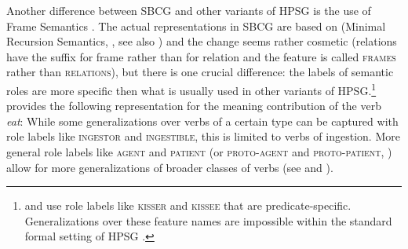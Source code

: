 \documentclass[output=paper
	        ,collection
	        ,collectionchapter
 	        ,biblatex
                ,babelshorthands
                ,newtxmath
                ,draftmode
                ,colorlinks, citecolor=brown
]{langscibook}
\begin{document}
Another difference between SBCG and other variants of HPSG is the use of Frame Semantics
\citep{Fillmore82a-u,Fillmore85b-u}. The actual representations in SBCG are based on \mrs (Minimal
Recursion Semantics, \citealt{CFPS2005a}, see also ) and
the change seems rather cosmetic (relations have the suffix  for frame rather than
 for relation and the feature is called \textsc{frames} rather than
\textsc{relations}), but there is one crucial difference: the labels of semantic roles
are more specific then what is usually used in other variants of HPSG.\footnote{
  \citet[]{ps} and \citet{ps2} use role labels like \textsc{kisser} and \textsc{kissee} that are predicate-specific. 
  Generalizations over these feature names are impossible within the standard formal setting of
  HPSG \parencites[Section~8.5.3]{ps2}[, Fn.~1]{Mueller99a}.
}
\citet[]{Sag2012a} provides the following representation for the meaning contribution of the
verb \emph{eat}:
\ea
\z
While some generalizations over verbs of a certain type can be captured with role labels like
\textsc{ingestor} and \textsc{ingestible}, this is limited to verbs of ingestion. More general role
labels like \textsc{agent} and \textsc{patient} (or \textsc{proto-agent} and \textsc{proto-patient},
\citealt{Dowty91a}) allow for more generalizations of broader classes of verbs (see
\citealt{DK2000b-u} and ).


\end{document}
